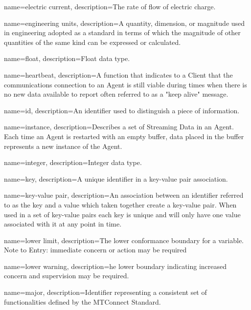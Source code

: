 {
    name={electric current},
	description={The rate of flow of electric charge.}
}

{
    name={engineering units},
	description={A quantity, dimension, or magnitude used in engineering adopted as a standard in terms of which the magnitude of other quantities of the same kind can be expressed or calculated.}
}

{
    name={float},
	description={Float data type.}
}

{
    name={heartbeat},
	description={A function that indicates to a \gls{Client} that the communications connection to an \gls{Agent} is still viable during times when there is no new data available to report  often referred to as a "keep alive" message.}
}

{
    name={id},
	description={An identifier used to distinguish a piece of information.}
}

{
    name={instance},
	description={Describes a set of \gls{Streaming Data} in an \gls{Agent}.  Each time an \gls{Agent} is restarted with an empty \gls{buffer}, data placed in the \gls{buffer} represents a new \gls{instance} of the \gls{Agent}.}
}

{
    name={integer},
	description={Integer data type.}
}

{
    name={key},
	description={A unique identifier in a \gls{key-value pair} association.}
}

{
    name={key-value pair},
	description={An association between an identifier referred to as the \gls{key} and a value which taken together create a \gls{key-value pair}. When used in a set of \glspl{key-value pair} each \gls{key} is unique and will only have one value associated with it at any point in time.}
}

{
    name={lower limit},
	description={The lower conformance boundary for a variable.
Note to Entry: immediate concern or action may be required}
}

{
    name={lower warning},
	description={he lower boundary indicating increased concern and supervision may be required.}
}

{
    name={major},
	description={Identifier representing a consistent set of functionalities defined by the MTConnect Standard.}
}

